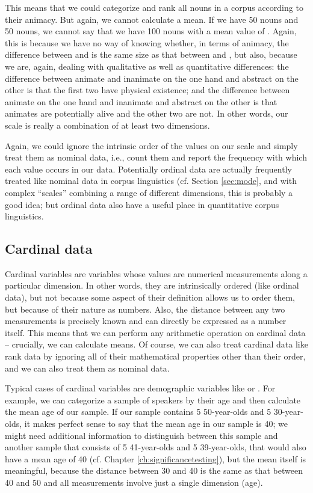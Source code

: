 This means that we could categorize and rank all nouns in a corpus according to their animacy. But again, we cannot calculate a mean. If we have 50  nouns and 50  nouns, we cannot say that we have 100 nouns with a mean value of . Again, this is because we have no way of knowing whether, in terms of animacy, the difference between  and  is the same size as that between  and , but also, because we are, again, dealing with qualitative as well as quantitative differences: the difference between animate and inanimate on the one hand and abstract on the other is that the first two have physical existence; and the difference between animate on the one hand and inanimate and abstract on the other is that animates are potentially alive and the other two are not. In other words, our scale is really a combination of at least two dimensions.

Again, we could ignore the intrinsic order of the values on our  scale and simply treat them as nominal data, i.e., count them and report the frequency with which each value occurs in our data. Potentially ordinal data are actually frequently treated like nominal data in corpus linguistics (cf. Section \ref{sec:mode}, and with complex ``scales'' combining a range of different dimensions, this is probably a good idea; but ordinal data also have a useful place in quantitative corpus linguistics.

\subsection{Cardinal data}
\label{sec:cardinaldata}

Cardinal variables are variables whose values are numerical measurements along a particular dimension. In other words, they are intrinsically ordered (like ordinal data), but not because some aspect of their definition allows us to order them, but because of their nature as numbers. Also, the distance between any two measurements is precisely known and can directly be expressed as a number itself. This means that we can perform any arithmetic operation on cardinal data -- crucially, we can calculate means. Of course, we can also treat cardinal data like rank data by ignoring all of their mathematical properties other than their order, and we can also treat them as nominal data.

Typical cases of cardinal variables are demographic variables like  or . For example, we can categorize a sample of speakers by their age and then calculate the mean age of our sample. If our sample contains 5 50-year-olds and 5 30-year-olds, it makes perfect sense to say that the mean age in our sample is 40; we might need additional information to distinguish between this sample and another sample that consists of 5 41-year-olds and 5 39-year-olds, that would also have a mean age of 40 (cf. Chapter \ref{ch:significancetesting}), but the mean itself is meaningful, because the distance between 30 and 40 is the same as that between 40 and 50 and all measurements involve just a single dimension (age).

